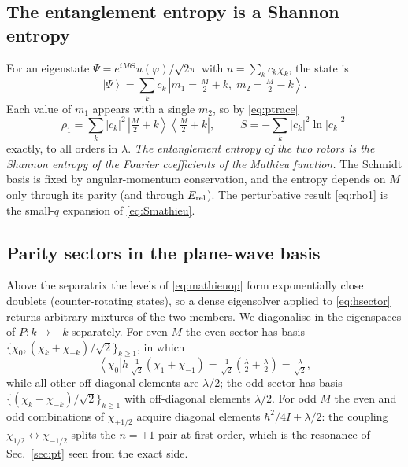 \documentclass[preprint,12pt]{elsarticle}
\newcommand{\ket}[1]{\left|#1\right\rangle}
\newcommand{\bra}[1]{\left\langle#1\right|}
\newcommand{\ketbra}[2]{\left|#1\right\rangle\!\left\langle#2\right|}
\newcommand{\Erel}{E_{\rm rel}}
\begin{document}
\subsection{The entanglement entropy is a Shannon entropy}

For an eigenstate $\Psi=e^{iM\Theta}u(\varphi)/\sqrt{2\pi}$ with
$u=\sum_{k}c_{k}\chi_{k}$, the state is
\begin{equation}
\ket\Psi=\sum_{k}c_{k}\,\ket{m_{1}=\tfrac{M}{2}+k,\;m_{2}=\tfrac{M}{2}-k}.
\end{equation}
Each value of $m_{1}$ appears with a single $m_{2}$, so by \eqref{eq:ptrace}
\begin{equation}
\rho_{1}=\sum_{k}|c_{k}|^{2}\,\ketbra{\tfrac{M}{2}+k}{\tfrac{M}{2}+k},
\qquad
\boxed{\;S=-\sum_{k}|c_{k}|^{2}\ln|c_{k}|^{2}\;}
\label{eq:Smathieu}
\end{equation}
exactly, to all orders in $\lambda$. \emph{The entanglement entropy of the two
rotors is the Shannon entropy of the Fourier coefficients of the Mathieu
function.} The Schmidt basis is fixed by angular-momentum conservation, and the
entropy depends on $M$ only through its parity (and through $\Erel$). The
perturbative result \eqref{eq:rho1} is the small-$q$ expansion of
\eqref{eq:Smathieu}.

\subsection{Parity sectors in the plane-wave basis}

Above the separatrix the levels of \eqref{eq:mathieuop} form exponentially close
doublets (counter-rotating states), so a dense eigensolver applied to
\eqref{eq:hsector} returns arbitrary mixtures of the two members. We diagonalise
in the eigenspaces of $P:k\to-k$ separately. For even $M$ the even sector has
basis $\{\chi_{0},(\chi_{k}+\chi_{-k})/\sqrt2\}_{k\ge1}$, in which
\begin{equation}
\bra{\chi_{0}}h\,\tfrac{1}{\sqrt2}(\chi_{1}+\chi_{-1})
=\tfrac{1}{\sqrt2}\left(\tfrac{\lambda}{2}+\tfrac{\lambda}{2}\right)
=\tfrac{\lambda}{\sqrt2},
\end{equation}
while all other off-diagonal elements are $\lambda/2$; the odd sector has basis
$\{(\chi_{k}-\chi_{-k})/\sqrt2\}_{k\ge1}$ with off-diagonal elements $\lambda/2$.
For odd $M$ the even and odd combinations of $\chi_{\pm1/2}$ acquire diagonal
elements $\hbar^{2}/4I\pm\lambda/2$: the coupling $\chi_{1/2}\leftrightarrow
\chi_{-1/2}$ splits the $n=\pm1$ pair at first order, which is the resonance of
Sec.~\ref{sec:pt} seen from the exact side.
\end{document}
